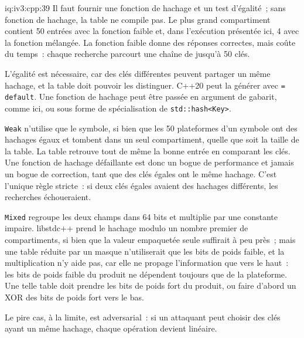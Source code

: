 \begin{solution}{iq:iv3:cpp:39}
Il faut fournir une fonction de hachage et un test d'égalité~; sans fonction de hachage, la table ne compile pas. Le plus grand compartiment contient 50 entrées avec la fonction faible et, dans l'exécution présentée ici, 4 avec la fonction mélangée. La fonction faible donne des réponses correctes, mais coûte du temps~: chaque recherche parcourt une chaîne de jusqu'à 50 clés.

L'égalité est nécessaire, car des clés différentes peuvent partager un même hachage, et la table doit pouvoir les distinguer. C++20 peut la générer avec \texttt{= default}. Une fonction de hachage peut être passée en argument de gabarit, comme ici, ou sous forme de spécialisation de \texttt{std::hash<Key>}.

\texttt{Weak} n'utilise que le symbole, si bien que les 50 plateformes d'un symbole ont des hachages égaux et tombent dans un seul compartiment, quelle que soit la taille de la table. La table retrouve tout de même la bonne entrée en comparant les clés. Une fonction de hachage défaillante est donc un bogue de performance et jamais un bogue de correction, tant que des clés égales ont le même hachage. C'est l'unique règle stricte~: si deux clés égales avaient des hachages différents, les recherches échoueraient.

\texttt{Mixed} regroupe les deux champs dans 64 bits et multiplie par une constante impaire. libstdc++ prend le hachage modulo un nombre premier de compartiments, si bien que la valeur empaquetée seule suffirait à peu près~; mais une table réduite par un masque n'utiliserait que les bits de poids faible, et la multiplication n'y aide pas, car elle ne propage l'information que vers le haut~: les bits de poids faible du produit ne dépendent toujours que de la plateforme. Une telle table doit prendre les bits de poids fort du produit, ou faire d'abord un XOR des bits de poids fort vers le bas.

Le pire cas, à la limite, est adversarial~: si un attaquant peut choisir des clés ayant un même hachage, chaque opération devient linéaire.

\end{solution}

